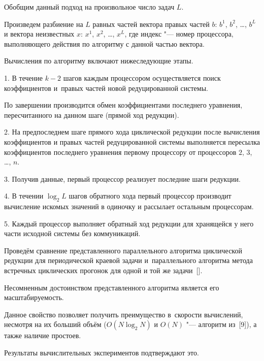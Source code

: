 Обобщим данный подход на произвольное число задач $L$.

Произведем разбиение на $L$ равных частей вектора правых частей $b$: $b^1$, $b^2$, \dots, $b^L$ и вектора неизвестных $x$:  $x^1$, $x^2$, \dots, $x^L$, где индекс "--- номер процессора, выполняющего действия по алгоритму с данной частью вектора. 

Вычисления по алгоритму включают нижеследующие этапы.





1. В течение $k-2$ шагов каждым процессором осуществляется поиск коэффициентов и~правых частей новой редуцированной системы. 

По завершении производится обмен коэффициентами последнего уравнения, пересчитанного на данном шаге (прямой ход редукции).



2. На предпоследнем шаге прямого хода циклической редукции после вычисления коэффициентов и правых частей редуцированной системы выполняется пересылка коэффициентов последнего уравнения первому процессору от процессоров $2$, $3$, \dots, $n$.



3. Получив данные, первый процессор реализует последние шаги редукции.



4. В течении $\log_{2}L$ шагов обратного хода первый процессор производит вычисление искомых значений в одиночку и рассылает остальным процессорам.



5. Каждый процессор выполняет обратный ход редукции для хранящейся у него части исходной системы без коммуникаций.




Проведём сравнение представленного параллельного алгоритма циклической редукции для периодической краевой задачи и~параллельного алгоритма метода встречных циклических прогонок для одной и той же задачи~[]. 

Несомненным достоинством представленного алгоритма является его масштабируемость. 

Данное свойство позволяет получить преимущество в~скорости вычислений, несмотря на их больший  объём ($O(N\log_2N)$ и $O(N)$ "--- алгоритм из~[9]), а также наличие простоев.



Результаты вычислительных экспериментов подтверждают это. 


